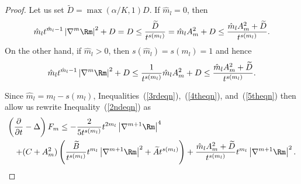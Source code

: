 \begin{proof}
Let us set $\widetilde D=\max(\alpha/K,1)D$. If $\hat m_l=0$, then
\begin{equation}\label{5theqn}
\hat m_lt^{\hat
m_l-1}\left\vert\nabla^m\Rm\right\vert^2+D =D\le
\frac{\widetilde D}{t^{s(m_l)}}=\hat m_lA_m^2+D\le \frac{\hat
m_lA_m^2+\widetilde D}{t^{s(m_l)}}.\end{equation}  On the other
hand, if $\hat m_l>0$, then $s(\hat m_l)=s(m_l)=1$ and hence
$$\hat m_lt^{\hat m_l-1}\left\vert\nabla^m\Rm\right\vert^2+D\le
\frac{1}{t^{s(m_l)}}\hat m_lA_m^2+D\le \frac{\hat
m_lA_m^2+\widetilde D}{t^{s(m_l)}}.$$


Since $\hat m_l =m_l-s(m_l)$,
Inequalities~(\ref{3rdeqn}),~(\ref{4theqn}), and~(\ref{5theqn}) then
allow us  rewrite Inequality~(\ref{2ndeqn}) as
\begin{eqnarray*}
\lefteqn{ \left(  \frac{\partial}{\partial t}-\Delta\right)F_m
 \leq   -\frac{2}{5t^{s( m_l)  }
 }t^{2m_l}\left\vert\nabla^{m+1}\Rm\right\vert^4}\\
& &  +(C+A_m^2)\left(\frac{\widetilde B}{t^{s(m_l)}}
t^{m_l}\left\vert\nabla^{m+1}\Rm\right\vert^2+\widetilde
At^{s(m_l)}\right) +\frac{\hat m_lA_m^2+\widetilde
D}{t^{s(m_l)}}t^{m_l}\left\vert\nabla^{m+1}\Rm
\right\vert^2.
\end{eqnarray*}


\end{proof}
